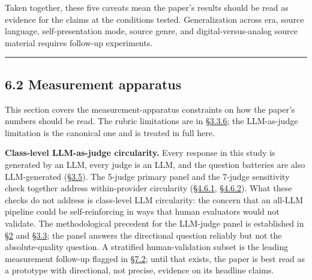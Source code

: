 Taken together, these five caveats mean the paper's results should be
read as evidence for the claims at the conditions tested. Generalization
across era, source language, self-presentation mode, source genre, and
digital-versus-analog source material requires follow-up experiments.

\begin{center}\rule{0.5\linewidth}{0.5pt}\end{center}

\hypertarget{measurement-apparatus}{%
\subsection{6.2 Measurement apparatus}\label{measurement-apparatus}}

This section covers the measurement-apparatus constraints on how the
paper's numbers should be read. The rubric limitations are in \hyperref[rubric-handling-limitations-post-hoc-validity-audit]{§3.3.6};
the LLM-as-judge limitation is the canonical one and is treated in full
here.

\textbf{Class-level LLM-as-judge circularity.} Every response in this
study is generated by an LLM, every judge is an LLM, and the question
batteries are also LLM-generated (\hyperref[question-battery-formation]{§3.5}). The 5-judge primary panel and
the 7-judge sensitivity check together address within-provider
circularity (\hyperref[cross-provider-response-generation-tier-2-replication]{§4.6.1}, \hyperref[judge-panel-sensitivity-5-judge-primary-vs-7-judge]{§4.6.2}). What these checks do not address is
class-level LLM circularity: the concern that an all-LLM pipeline could
be self-reinforcing in ways that human evaluators would not validate.
The methodological precedent for the LLM-judge panel is established in
\hyperref[prior-work-industry-benchmarks-the-fifth-target]{§2} and \hyperref[scoring-rubric-with-calibrated-llm-judge-panel]{§3.3}; the panel answers the directional question reliably but not
the absolute-quality question. A stratified human-validation subset is
the leading measurement follow-up flagged in \hyperref[measurement-methodology]{§7.2}; until that exists,
the paper is best read as a prototype with directional, not precise,
evidence on its headline claims.

